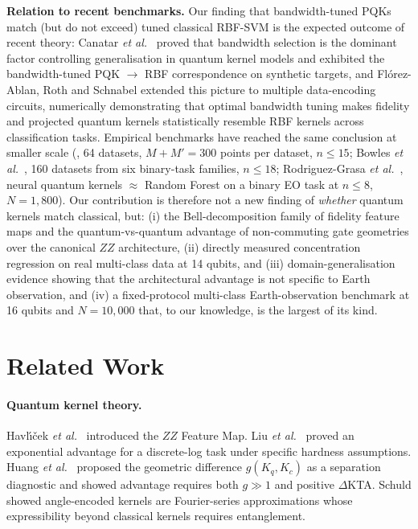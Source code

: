 \documentclass[pdflatex,sn-mathphys]{sn-jnl}
\theoremstyle{plain}
\theoremstyle{remark}
\theoremstyle{definition}
\begin{document}
\medskip
\noindent\textbf{Relation to recent benchmarks.}
Our finding that bandwidth-tuned PQKs match (but do not exceed) tuned classical RBF-SVM is the expected outcome of recent theory: Canatar \emph{et al.}\ \cite{canatar2022} proved that bandwidth selection is the dominant factor controlling generalisation in quantum kernel models and exhibited the bandwidth-tuned PQK $\to$ RBF correspondence on synthetic targets, and Fl{\'o}rez-Ablan, Roth and Schnabel \cite{florezablan2025} extended this picture to multiple data-encoding circuits, numerically demonstrating that optimal bandwidth tuning makes fidelity and projected quantum kernels statistically resemble RBF kernels across classification tasks. Empirical benchmarks have reached the same conclusion at smaller scale (\cite{schnabel2025}, 64 datasets, $M\!+\!M'\!=\!300$ points per dataset, $n\!\le\!15$; Bowles \emph{et al.}\ \cite{bowles2024}, 160 datasets from six binary-task families, $n\!\le\!18$; Rodriguez-Grasa \emph{et al.}\ \cite{rodriguez2025}, neural quantum kernels $\approx$ Random Forest on a binary EO task at $n\!\le\!8$, $N\!=\!1{,}800$). Our contribution is therefore not a new finding of \emph{whether} quantum kernels match classical, but: (i) the Bell-decomposition family of fidelity feature maps and the quantum-vs-quantum advantage of non-commuting gate geometries over the canonical $ZZ$ architecture, (ii) directly measured concentration regression on real multi-class data at 14 qubits, and (iii) domain-generalisation evidence showing that the architectural advantage is not specific to Earth observation, and (iv) a fixed-protocol multi-class Earth-observation benchmark at 16 qubits and $N=10{,}000$ that, to our knowledge, is the largest of its kind.

\section{Related Work}\label{sec:related}

\paragraph{Quantum kernel theory.}
Havl{\'\i}{\v{c}}ek \emph{et al.}\ \cite{havlicek2019} introduced the $ZZ$ Feature Map. Liu \emph{et al.}\ \cite{liu2021} proved an exponential advantage for a discrete-log task under specific hardness assumptions. Huang \emph{et al.}\ \cite{huang2021} proposed the geometric difference $g(K_q,K_c)$ as a separation diagnostic and showed advantage requires both $g\!\gg\!1$ and positive $\Delta$KTA. Schuld \cite{schuld2021} showed angle-encoded kernels are Fourier-series approximations whose expressibility beyond classical kernels requires entanglement.
\end{document}

